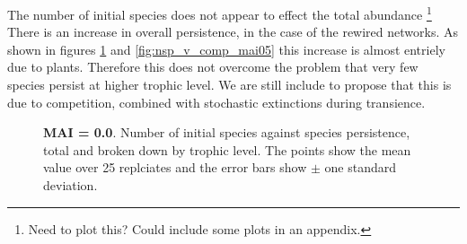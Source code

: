 The number of initial species does not appear to effect the total abundance \footnote{Need to plot this? Could include some plots in an appendix.} There is an increase in overall persistence, in the case of the rewired networks. As shown in figures \ref{fig:nsp_v_comp_mai00} and \ref{fig:nsp_v_comp_mai05} this increase is almost entriely due to plants. Therefore this does not overcome the problem that very few species persist at higher trophic level. We are still include to propose that this is due to competition, combined with stochastic extinctions during transience.


\begin{figure}
	\centering	
	\renewcommand{\thesubfigure}{}
	\setlength{\subfloatlabelskip}{0pt}
	\caption{\textbf{MAI = 0.0}. Number of initial species against species persistence, total and broken down by trophic level. The points show the mean value over 25 replciates and the error bars show $\pm$ one standard deviation.}
	\label{fig:nsp_v_comp_mai00}
\end{figure}



